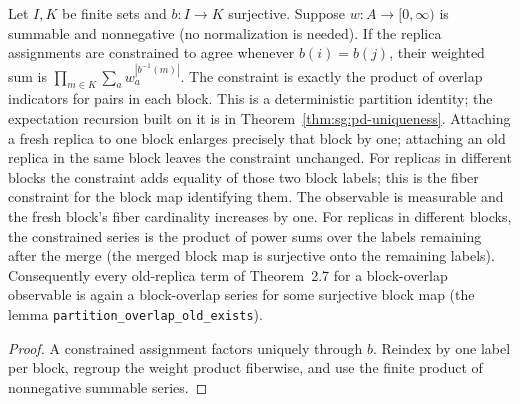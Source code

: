 \begin{lemma}\label{lem:sg:pd-partition-bridge}
  \leanok
Let $I,K$ be finite sets and $b:I\to K$ surjective. Suppose $w:A\to[0,\infty)$ is
summable and nonnegative (no normalization is needed). If the replica assignments are constrained to agree
whenever $b(i)=b(j)$, their weighted sum is
$\prod_{m\in K}\sum_aw_a^{|b^{-1}(m)|}$. The constraint is exactly the product
of overlap indicators for pairs in each block. This is a deterministic
partition identity; the expectation recursion built on it is in
Theorem~\ref{thm:sg:pd-uniqueness}. Attaching a fresh
replica to one block enlarges precisely that block by one; attaching an old
replica in the same block leaves the constraint unchanged. For replicas in
different blocks the constraint adds equality of those two block labels; this
is the fiber constraint for the block map identifying them. The observable is
measurable and the fresh block's fiber cardinality increases by one. For
replicas in different blocks, the constrained series is the product of power
sums over the labels remaining after the merge (the merged block map is surjective
onto the remaining labels). Consequently every old-replica term of
Theorem~2.7 for a block-overlap observable is again a block-overlap series for
some surjective block map (the lemma \texttt{partition\_overlap\_old\_exists}).
\end{lemma}
\begin{proof}
  \leanok
A constrained assignment factors uniquely through $b$. Reindex by one label
per block, regroup the weight product fiberwise, and use the finite product
of nonnegative summable series.
\end{proof}

